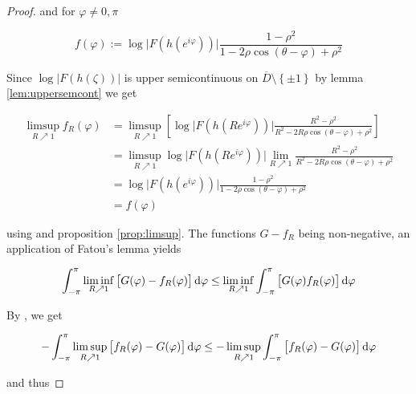 \begin{proof}
\noindent and for $\varphi \neq 0,\pi$

\begin{equation*}
	f(\varphi) := \log\vert F(h(e^{i\varphi}))\vert \frac{1 - \rho^2}{1 - 2\rho\cos(\theta - \varphi) + \rho^2}
\end{equation*}

Since $\log\vert F(h(\zeta))\vert$ is upper semicontinuous on $\overline{D} \setminus \left\{ \pm 1\right\}$ by lemma \ref{lem:uppersemcont} we get

\begin{equation*}
	\begin{aligned}
		\limsup_{R \nearrow 1}f_R(\varphi) &= \limsup_{R \nearrow 1} \left[ \log\vert F(h(Re^{i\varphi}))\vert \frac{R^2 - \rho^2}{R^2 - 2R\rho\cos(\theta - \varphi) + \rho^2}\right]\\
		&= \limsup_{R \nearrow 1} \log\vert F(h(Re^{i\varphi}))\vert \lim_{R \nearrow 1} \frac{R^2 - \rho^2}{R^2 - 2R\rho\cos(\theta - \varphi) + \rho^2}\\
		&= \log\vert F(h(e^{i\varphi}))\vert \frac{1 - \rho^2}{1 - 2\rho\cos(\theta - \varphi) + \rho^2}\\
		&= f(\varphi)
	\end{aligned}
\end{equation*}

\noindent using \cite[363]{bourbaki:general_topology:1995} and proposition \ref{prop:limsup}. The functions $G - f_R$ being non-negative, an application of Fatou's lemma yields

\begin{equation*}
	\int_{-\pi}^\pi \liminf_{R \nearrow 1}\left[ G(\varphi) - f_R(\varphi)\right]\mathop{}\!\mathrm{d}\varphi \leq \liminf_{R \nearrow 1} \int_{-\pi}^\pi \left[ G(\varphi) f_R(\varphi)\right]\mathop{}\!\mathrm{d}\varphi
\end{equation*}

By \cite[354]{bourbaki:general_topology:1995}, we get

\begin{equation*}
	-\int_{-\pi}^\pi \limsup_{R \nearrow 1}\left[ f_R(\varphi) - G(\varphi)\right]\mathop{}\!\mathrm{d}\varphi \leq -\limsup_{R \nearrow 1} \int_{-\pi}^\pi \left[ f_R(\varphi) - G(\varphi)\right]\mathop{}\!\mathrm{d} \varphi
\end{equation*}

and thus


\end{proof}
